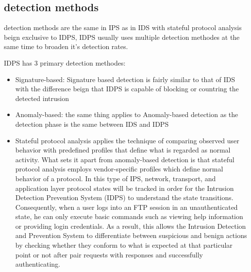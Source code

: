\subsection{detection methods}

detection methods are the same in IPS as in IDS with stateful protocol analysis beign exclusive to IDPS, IDPS usually uses multiple detection methodes at the same time to broaden it's detection rates. \cite{NIST-IDPS}

IDPS has 3 primary detection methodes:


\begin{itemize}
	\item Signature-based: Signature based detection is fairly similar to that of IDS with the difference beign that IDPS is capable of blocking or countring the detected intrusion
	\item Anomaly-based: the same thing applies to Anomaly-based detection as the detection phase is the same between IDS and IDPS
	\item Stateful protocol analysis applies the technique of comparing observed user behavior with predefined profiles that define what is regarded as normal activity. What sets it apart from anomaly-based detection is that stateful protocol analysis employs vendor-specific profiles which define normal behavior of a protocol. In this type of IPS, network, transport, and application layer protocol states will be tracked in order for the Intrusion Detection Prevention System (IDPS) to understand the state transitions. Consequently, when a user logs into an FTP session in an unauthenticated state, he can only execute basic commands such as viewing help information or providing login credentials. As a result, this allows the Intrusion Detection and Prevention System to differentiate between suspicious and benign actions by checking whether they conform to what is expected at that particular point or not after pair requests with responses and successfully authenticating. \cite{NIST-IDPS19-20}
	

\end{itemize}









